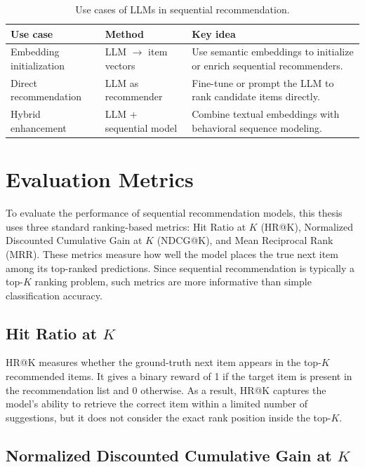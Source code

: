 \documentclass[12pt,a4paper]{report}
\begin{document}
\begin{table}[h]
\centering
\begin{tabular}{p{3cm} p{3.5cm} p{6.3cm}}
\toprule
\textbf{Use case} & \textbf{Method} & \textbf{Key idea} \\
\midrule
Embedding initialization & LLM \(\rightarrow\) item vectors & Use semantic embeddings to initialize or enrich sequential recommenders. \\
Direct recommendation & LLM as recommender & Fine-tune or prompt the LLM to rank candidate items directly. \\
Hybrid enhancement & LLM + sequential model & Combine textual embeddings with behavioral sequence modeling. \\
\bottomrule
\end{tabular}
\caption{Use cases of LLMs in sequential recommendation.}
\label{tab:llm_seq}
\end{table}


\section{Evaluation Metrics}

\justifying
To evaluate the performance of sequential recommendation models, this thesis
uses three standard ranking-based metrics: Hit Ratio at \(K\) (HR@K),
Normalized Discounted Cumulative Gain at \(K\) (NDCG@K), and Mean Reciprocal
Rank (MRR). These metrics measure how well the model places the true next item
among its top-ranked predictions. Since sequential recommendation is typically a
top-\(K\) ranking problem, such metrics are more informative than simple
classification accuracy.

\subsection{Hit Ratio at \(K\)}

HR@K measures whether the ground-truth next item appears in the top-\(K\)
recommended items. It gives a binary reward of 1 if the target item is present
in the recommendation list and 0 otherwise. As a result, HR@K captures the
model's ability to retrieve the correct item within a limited number of
suggestions, but it does not consider the exact rank position inside the top-\(K\).

\subsection{Normalized Discounted Cumulative Gain at \(K\)}
\end{document}
